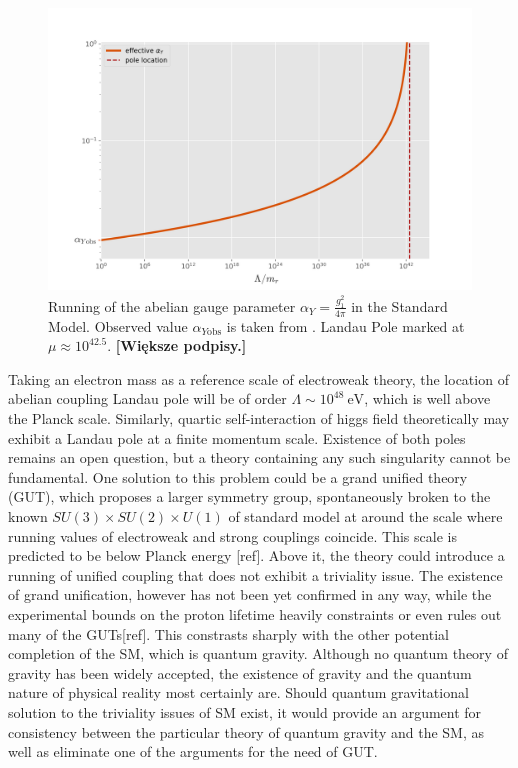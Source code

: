 \documentclass[11pt, a4paper]{article}
\newcommand{\jhkbf}[1]{\textbf{\color{red} [#1]}}
\begin{document}
\begin{figure}[H]
    \includegraphics[width=1\textwidth]{./figures/plotr.jpg}
    \caption{Running of the abelian gauge parameter $\alpha_{Y} = \frac{g_1^2}{4\pi}$ in the Standard Model. Observed value $\alpha_{Y\text{obs}}$ is taken from \cite{pdg}. 
    Landau Pole marked at $\mu \approx 10^{42.5}$. \jhkbf{Większe podpisy.}}
    \label{boxes}
\end{figure}
Taking an electron mass as a reference scale of electroweak theory, the location of abelian coupling Landau pole 
will be of order $\Lambda \sim 10^{48} \ \text{eV}$, which is well above the Planck scale.
Similarly, quartic self-interaction of higgs field theoretically may exhibit a Landau pole at a finite momentum scale.
Existence of both poles remains an open question, but a theory containing any such singularity cannot be fundamental.
One solution to this problem could be a grand unified theory (GUT), which proposes a larger symmetry group, spontaneously broken
to the known $SU(3)\times SU(2) \times U(1)$ of standard model at around the scale where running values of electroweak and strong couplings
coincide. This scale is predicted to be below Planck energy [ref]. Above it, the theory could introduce
a running of unified coupling that does not exhibit a triviality issue.
The existence of grand unification, however has not been yet confirmed in any way, while the experimental bounds on the proton lifetime
heavily constraints or even rules out many of the GUTs[ref]. This constrasts sharply with the other potential completion of the SM,
which is quantum gravity. Although no quantum theory of gravity has been widely accepted, the existence of gravity and
the quantum nature of physical reality most certainly are. Should quantum gravitational solution to the triviality issues of SM exist,
it would provide an argument for consistency between the particular theory of quantum gravity and the SM, as well as eliminate one of the arguments for the need of GUT.
\end{document}
